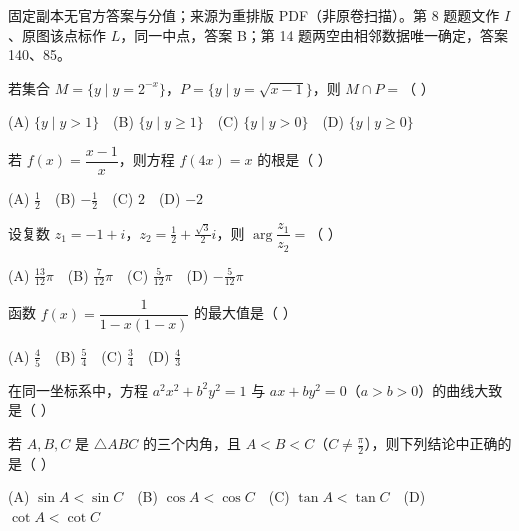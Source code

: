 

\begin{gktip}
固定副本无官方答案与分值；来源为重排版 PDF（非原卷扫描）。第 8 题题文作 $I$、原图该点标作 $L$，同一中点，答案 B；第 14 题两空由相邻数据唯一确定，答案 140、85。
\end{gktip}


\begin{question}
若集合 $M=\{y\mid y=2^{-x}\}$，$P=\{y\mid y=\sqrt{x-1}\}$，则 $M\cap P=$（ ）

   (A) $\{y\mid y>1\}$　(B) $\{y\mid y\ge1\}$　(C) $\{y\mid y>0\}$　(D) $\{y\mid y\ge0\}$

\end{question}
\begin{question}
若 $f(x)=\dfrac{x-1}{x}$，则方程 $f(4x)=x$ 的根是（ ）

   (A) $\frac12$　(B) $-\frac12$　(C) $2$　(D) $-2$

\end{question}
\begin{question}
设复数 $z_1=-1+i$，$z_2=\frac12+\frac{\sqrt3}{2}i$，则 $\arg\dfrac{z_1}{z_2}=$（ ）

   (A) $\frac{13}{12}\pi$　(B) $\frac7{12}\pi$　(C) $\frac5{12}\pi$　(D) $-\frac5{12}\pi$

\end{question}
\begin{question}
函数 $f(x)=\dfrac1{1-x(1-x)}$ 的最大值是（ ）

   (A) $\frac45$　(B) $\frac54$　(C) $\frac34$　(D) $\frac43$

\Needspace{0.4\textheight}
\end{question}
\begin{question}
在同一坐标系中，方程 $a^2x^2+b^2y^2=1$ 与 $ax+by^2=0$（$a>b>0$）的曲线大致是（ ）
\nopagebreak[4]
\begin{center}\end{center}
\nopagebreak[4]
\end{question}
\begin{question}
若 $A,B,C$ 是 $\triangle ABC$ 的三个内角，且 $A<B<C$（$C\ne\frac\pi2$），则下列结论中正确的是（ ）

   (A) $\sin A<\sin C$　(B) $\cos A<\cos C$　(C) $\tan A<\tan C$　(D) $\cot A<\cot C$

\end{question}
